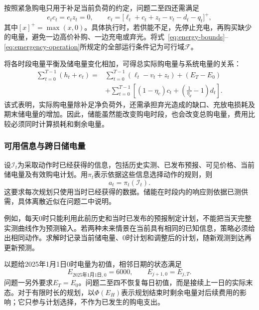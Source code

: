 按照紧急购电只用于补足当前负荷的约定，问题二至四还需满足
\begin{equation}
  e_tc_t=e_tz_t=0,\qquad
  e_t=\bigl[\ell_t+c_t+z_t-v_t-d_t-q_t\bigr]^+,
  \label{eq:emergency-operation}
\end{equation}
其中$[x]^+=\max(x,0)$。具体执行时，若供能不足，先停止充电，再购买缺少的电量，避免一边高价补购、一边充电或弃光。将式~\eqref{eq:energy-bounds}--\eqref{eq:emergency-operation}所规定的全部运行条件记为可行域$\mathcal F$。

将各时段电量平衡及储电量变化相加，可得总实际购电量与系统电量的关系：
\begin{equation}
\begin{aligned}
  \sum_{t=0}^{T-1}(h_t+e_t)
  ={}&\sum_{t=0}^{T-1}(\ell_t-v_t+z_t)+(E_T-E_0)\\
     &+\sum_{t=0}^{T-1}\left[(1-\eta_c)c_t+
       \left(\frac{1}{\eta_d}-1\right)d_t\right].
\end{aligned}
\label{eq:aggregate-balance}
\end{equation}
该式表明，实际购电量除补足净负荷外，还需承担弃光造成的缺口、充放电损耗及期末储电量的增加。因此，储能虽然能改变购电时段，也会改变总购电量，费用比较必须同时计算损耗和剩余电量。

\subsubsection{可用信息与跨日储电量}

设$\mathcal I_t$为采取动作时已经获得的信息，包括历史实测、已发布预报、可见价格、当前储电量及有效购电计划。用$\pi_t$表示依据这些信息选择动作的规则，则
\begin{equation}
  a_t=\pi_t(\mathcal I_t).
  \label{eq:causality}
\end{equation}
这要求每次规划只使用当时已经获得的数据。储能在时段内的响应则依据已测供需，具体离散近似在问题二中说明。

例如，每天0时只能利用此前历史和当时已发布的预报制定计划，不能把当天完整实测曲线作为预测输入。若两种未来情景在当前具有相同的已知信息，策略必须给出相同动作。求解时记录当前储电量、0时计划和调整后的计划，随新观测到达再更新预测。

以题给2025年1月1日0时电量为初值，相邻日期的状态满足
\begin{equation}
  E_{\text{2025年1月1日},0}=6000,\qquad
  E_{j+1,0}=E_{j,T}.
  \label{eq:day-continuity}
\end{equation}
问题一另外要求$E_T=E_0$。问题二至四不恢复每日初值，而是接续上一日的实际末态。对于有限时长的规划，以$\Phi(E_H)$表示规划结束时剩余电量对后续费用的影响；它只参与计划选择，不作为已发生的购电支出。


